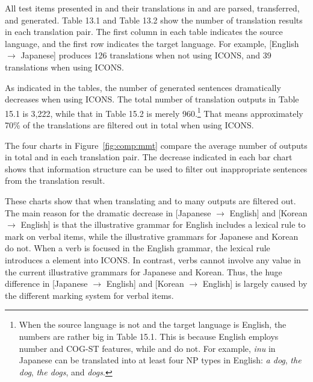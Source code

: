 \noindent All test items presented in  and
their translations in  and  are parsed,
transferred, and generated.  Table 13.1 and Table 13.2 show the number
of translation results in each translation pair. The first column in
each table indicates the source language, and the first row indicates
the target language. For example, [English \ensuremath{\rightarrow}
Japanese] produces 126 translations when not using ICONS, and 39
translations when using ICONS.


As indicated in the tables, the number of generated sentences
dramatically decreases when using ICONS. The total number of
translation outputs in Table 15.1 is 3,222, while that in Table 15.2
is merely 960.\footnote{When the source language is not  and
  the target language is English, the numbers are rather big in Table
  15.1. This is because English employs number and COG-ST features,
  while  and  do not. For example,
  \textit{inu} in Japanese can be translated into at least four NP
  types in English: \textit{a dog}, \textit{the dog}, \textit{the
    dogs}, and \textit{dogs}.} That means approximately 70\% of the
translations are filtered out in total when using ICONS.



The four charts in Figure~\ref{fig:comp:mmt} compare the average
number of outputs in total and in each translation pair. The decrease
indicated in each bar chart shows that information structure can be
used to filter out inappropriate sentences from the translation
result.




These charts show that when translating  and
 to  many outputs are filtered out. The main reason
for the dramatic decrease in [Japanese \ensuremath{\rightarrow} English]
and [Korean \ensuremath{\rightarrow} English] is that the illustrative
grammar for English includes a lexical rule to mark  on verbal
items, while the illustrative grammars for Japanese and Korean do
not. When a verb is focused in the English grammar, 
the lexical rule introduces a  element into ICONS.
In contrast, verbs cannot involve any  
value in the current illustrative grammars
for Japanese and Korean. Thus, the huge difference in [Japanese
\ensuremath{\rightarrow} English] and [Korean \ensuremath{\rightarrow}
English] is largely caused by the different marking system for verbal
items.


